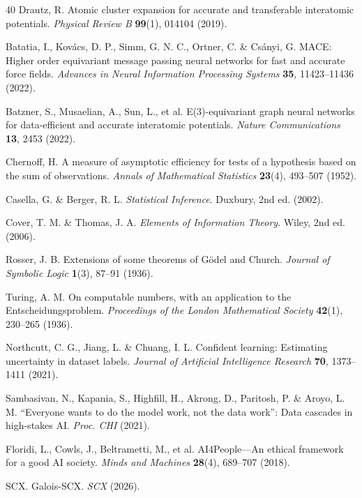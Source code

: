 \documentclass[12pt,a4paper]{article}
\theoremstyle{remark}
\begin{document}
\begin{thebibliography}{40}
Drautz, R. Atomic cluster expansion for accurate and transferable interatomic potentials.
\textit{Physical Review B} \textbf{99}(1), 014104 (2019).

Batatia, I., Kov\'acs, D. P., Simm, G. N. C., Ortner, C. \& Cs\'anyi, G.
MACE: Higher order equivariant message passing neural networks for fast and accurate 
force fields.
\textit{Advances in Neural Information Processing Systems} \textbf{35}, 11423--11436 (2022).

Batzner, S., Musaelian, A., Sun, L., et al. E(3)-equivariant graph neural networks 
for data-efficient and accurate interatomic potentials.
\textit{Nature Communications} \textbf{13}, 2453 (2022).

Chernoff, H. A measure of asymptotic efficiency for tests of a hypothesis based on 
the sum of observations.
\textit{Annals of Mathematical Statistics} \textbf{23}(4), 493--507 (1952).

Casella, G. \& Berger, R. L. \textit{Statistical Inference}. Duxbury, 2nd ed. (2002).

Cover, T. M. \& Thomas, J. A. \textit{Elements of Information Theory}. 
Wiley, 2nd ed. (2006).

Rosser, J. B. Extensions of some theorems of G\"odel and Church.
\textit{Journal of Symbolic Logic} \textbf{1}(3), 87--91 (1936).

Turing, A. M. On computable numbers, with an application to the Entscheidungsproblem.
\textit{Proceedings of the London Mathematical Society} \textbf{42}(1), 230--265 (1936).

Northcutt, C. G., Jiang, L. \& Chuang, I. L. Confident learning: Estimating uncertainty 
in dataset labels.
\textit{Journal of Artificial Intelligence Research} \textbf{70}, 1373--1411 (2021).

Sambasivan, N., Kapania, S., Highfill, H., Akrong, D., Paritosh, P. \& Aroyo, L. M.
``Everyone wants to do the model work, not the data work'': Data cascades in high-stakes AI.
\textit{Proc. CHI} (2021).

Floridi, L., Cowls, J., Beltrametti, M., et al. AI4People---An ethical framework for 
a good AI society.
\textit{Minds and Machines} \textbf{28}(4), 689--707 (2018).

SCX. Galois-SCX.
\textit{SCX} (2026).


\end{thebibliography}
\end{document}
